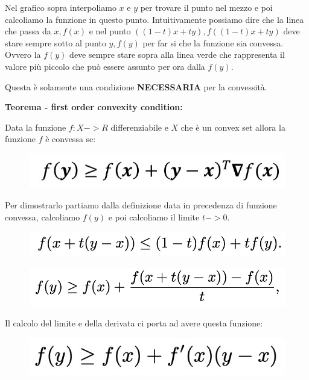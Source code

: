 \documentclass[14pt]{extreport}
\begin{document}
Nel grafico sopra interpoliamo $x$ e $y$ per trovare il punto nel mezzo e poi calcoliamo la funzione in questo punto. Intuitivamente possiamo dire che
la linea che passa da $x, f(x)$ e nel punto $((1-t)x+ty), f((1-t)x+ty)$ deve stare sempre sotto al punto $y, f(y)$ per far si che la funzione sia
convessa. Ovvero la $f(y)$ deve sempre stare sopra alla linea verde che rappresenta il valore più piccolo che può essere assunto per ora dalla $f(y)$.

Questa è solamente una condizione \textbf{NECESSARIA} per la convessità.

\textbf{Teorema - first order convexity condition:}

Data la funzione $f: X -> R$ differenziabile e $X$ che è un convex set allora la funzione $f$ è convessa se:

\begin{figure}[H]
\centering
\includegraphics[width=0.7\linewidth]{223.jpeg}
\end{figure}

Per dimostrarlo partiamo dalla definizione data in precedenza di funzione convessa, calcoliamo $f(y)$  e poi calcoliamo il limite $t->0$.

\begin{figure}[H]
\centering
\includegraphics[width=0.5\linewidth]{224.jpeg}
\end{figure}

\begin{figure}[H]
\centering
\includegraphics[width=0.5\linewidth]{225.jpeg}
\end{figure}


Il calcolo del limite e della derivata ci porta ad avere questa funzione:

\begin{figure}[H]
\centering
\includegraphics[width=0.5\linewidth]{226.jpeg}
\end{figure}
\end{document}
